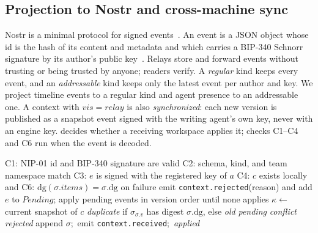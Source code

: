 \documentclass[10pt,conference]{IEEEtran}
\theoremstyle{definition}
\newcommand{\code}[1]{\texttt{#1}}
\newcommand{\dig}{\mathrm{dg}}
\begin{document}
\subsection{Projection to Nostr and cross-machine sync}\label{sec:sync}

Nostr is a minimal protocol for signed events~\cite{nip01}. An event is a JSON object whose id is the hash of
its content and metadata and which carries a BIP-340 Schnorr signature by its author's public
key~\cite{bip340}. Relays store and forward events without trusting or being trusted by anyone; readers
verify. A \emph{regular} kind keeps every event, and an \emph{addressable} kind keeps only the latest event per
author and key. We project timeline events to a regular kind and agent presence to an addressable one. A
context with $\mathit{vis}=\mathit{relay}$ is also \emph{synchronized}: each new version is published as a
snapshot event signed with the writing agent's own key, never with an engine key.  decides
whether a receiving workspace applies it; checks C1--C4 and C6 run when the event is decoded.

\begin{algorithm}[t]
\caption{Applying a received context snapshot (untrusted input)}
\label{alg:sync}
\small
\begin{algorithmic}[1]
 
  \State C1: NIP-01 id and BIP-340 signature are valid
  \State C2: schema, kind, and team namespace match
  \State C3: $e$ is signed with the registered key of $a$
  \State C4: $c$ exists locally and 
  \State C6: $\dig(\sigma.\mathit{items})=\sigma.\dig$ 
  \State on failure emit \code{context.rejected}(reason) and \Return
  \State add $e$ to $\mathit{Pending}$; apply pending events in version order until none applies
\EndFunction
{} 
  \State $\kappa\gets$ current snapshot of $c$
   \Return \emph{duplicate} if $\sigma_{\sigma.v}$ has digest $\sigma.\dig$, else \emph{old}
  \EndIf
   \Return \emph{pending} 
  \EndIf
  \If{$\beta\neq\dig(\kappa)$} \Return \emph{conflict} 
  \EndIf
   \Return \emph{rejected} 
  \EndIf
  \State append $\sigma$;\ emit \code{context.received};\ \Return \emph{applied}
\EndFunction
\end{algorithmic}
\end{algorithm}
\end{document}
